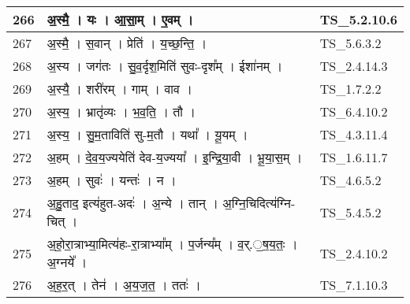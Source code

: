 \documentclass[17pt]{extarticle}
\begin{document}
\begin{longtable}{||p{0.4in}||p{4.9in}||p{0.9in}||}
    \hline
        
    266 & अ॒स्मै॒   ।   यः   ।   आ॒सा॒म्   ।   ए॒वम्   ।    & TS\_5.2.10.6       \\
    
    \hline
        
    267 & अ॒स्मै॒   ।   स॒वान्   ।   प्रेति॑   ।   य॒च्छ॒न्ति॒   ।    & TS\_5.6.3.2       \\
    
    \hline
        
    268 & अ॒स्य   ।   जग॑तः   ।   सु॒व॒र्दृश॒मिति॑ सुवः{-}दृश᳚म्   ।   ईशा॑नम्   ।    & TS\_2.4.14.3       \\
    
    \hline
        
    269 & अ॒स्यै॒   ।   शरी॑रम्   ।   गाम्   ।   वाव   ।    & TS\_1.7.2.2       \\
    
    \hline
        
    270 & अ॒स्य॒   ।   भ्रातृ॑व्यः   ।   भ॒व॒ति॒   ।   तौ   ।    & TS\_6.4.10.2       \\
    
    \hline
        
    271 & अ॒स्य॒   ।   सु॒म॒ताविति॑ सु{-}म॒तौ   ।   यथा᳚   ।   यू॒यम्   ।    & TS\_4.3.11.4       \\
    
    \hline
        
    272 & अ॒हम्   ।   दे॒व॒य॒ज्ययेति॑ देव{-}य॒ज्यया᳚   ।   इ॒न्द्रि॒या॒वी   ।   भू॒या॒स॒म्   ।    & TS\_1.6.11.7       \\
    
    \hline
        
    273 & अ॒हम्   ।   सुवः॑   ।   यन्तः॑   ।   न   ।    & TS\_4.6.5.2       \\
    
    \hline
        
    274 & अ॒हु॒ताद॒ इत्य॑हुत{-}अदः॑   ।   अ॒न्ये   ।   तान्   ।   अ॒ग्नि॒चिदित्य॑ग्नि{-}चित्   ।    & TS\_5.4.5.2       \\
    
    \hline
        
    275 & अ॒हो॒रा॒त्राभ्या॒मित्य॑हः{-}रा॒त्राभ्या᳚म्   ।   प॒र्जन्य᳚म्   ।   व॒र्.॒ष॒य॒तः॒   ।   अ॒ग्नये᳚   ।    & TS\_2.4.10.2       \\
    
    \hline
        
    276 & अ॒ह॒र॒त्   ।   तेन॑   ।   अ॒य॒ज॒त॒   ।   ततः॑   ।    & TS\_7.1.10.3       \\
    

\end{longtable}
\end{document}
